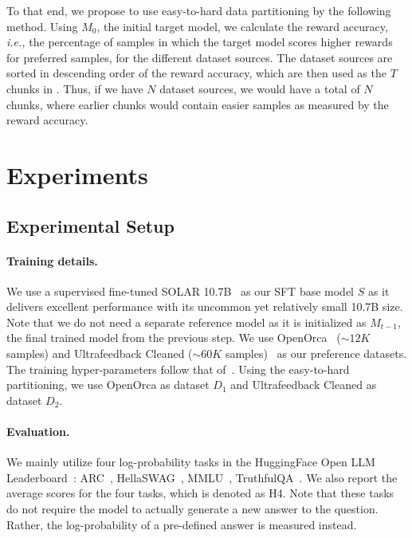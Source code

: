 To that end, we propose to use easy-to-hard data partitioning by the following method.
Using $M_0$, the initial target model, we calculate the reward accuracy, \textit{i.e.,} the percentage of samples in which the target model scores higher rewards for preferred samples, for the different dataset sources.
The dataset sources are sorted in descending order of the reward accuracy, which are then used as the $T$ chunks in \method.
Thus, if we have $N$ dataset sources, we would have a total of $N$ chunks, where earlier chunks would contain easier samples as measured by the reward accuracy.

\section{Experiments}
\subsection{Experimental Setup}
\paragraph{Training details.} We use a supervised fine-tuned SOLAR 10.7B~\cite{kim2023solar} as our SFT base model $S$ as it delivers excellent performance with its uncommon yet relatively small 10.7B size.
Note that we do not need a separate reference model as it is initialized as $M_{t-1}$, the final trained model from the previous step. 
We use OpenOrca~\cite{mukherjee2023orca} ($\sim12K$ samples) and Ultrafeedback Cleaned ($\sim60K$ samples)~\cite{cui2023ultrafeedback, ivison2023camels} as our preference datasets.
The training hyper-parameters follow that of~\citet{tunstall2023zephyr}.
Using the easy-to-hard partitioning, we use OpenOrca as dataset $D_1$ and Ultrafeedback Cleaned as dataset $D_2$.

\paragraph{Evaluation.} We mainly utilize four log-probability tasks in the HuggingFace Open LLM Leaderboard~\cite{open-llm-leaderboard}: ARC~\cite{clark2018think}, HellaSWAG~\cite{zellers2019hellaswag}, MMLU~\cite{hendrycks2020measuring}, TruthfulQA~\cite{lin2022truthfulqa}.
We also report the average scores for the four tasks, which is denoted as H4.
Note that these tasks do not require the model to actually generate a new answer to the question.
Rather, the log-probability of a pre-defined answer is measured instead.

